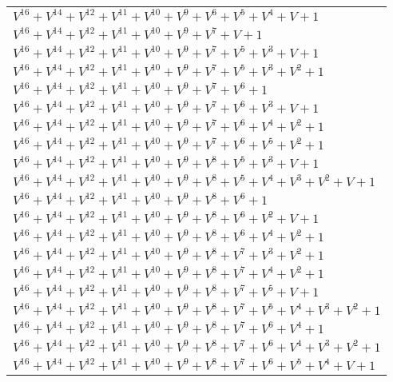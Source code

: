 \documentclass[12pt]{article}
\begin{document}
\begin{adjustwidth}{-4cm}{}
\begin{center}
\begin{longtable}{|l|}
$V^{16}  +V^{14}  +V^{12}  +V^{11}  +V^{10}  +V^{9}  +V^{6}  +V^{5}  +V^{4}  + V + 1$ \\
$V^{16}  +V^{14}  +V^{12}  +V^{11}  +V^{10}  +V^{9}  +V^{7}  + V + 1$ \\
$V^{16}  +V^{14}  +V^{12}  +V^{11}  +V^{10}  +V^{9}  +V^{7}  +V^{5}  +V^{3}  + V + 1$ \\
$V^{16}  +V^{14}  +V^{12}  +V^{11}  +V^{10}  +V^{9}  +V^{7}  +V^{5}  +V^{3}  +V^{2}  + 1$ \\
$V^{16}  +V^{14}  +V^{12}  +V^{11}  +V^{10}  +V^{9}  +V^{7}  +V^{6}  + 1$ \\
$V^{16}  +V^{14}  +V^{12}  +V^{11}  +V^{10}  +V^{9}  +V^{7}  +V^{6}  +V^{3}  + V + 1$ \\
$V^{16}  +V^{14}  +V^{12}  +V^{11}  +V^{10}  +V^{9}  +V^{7}  +V^{6}  +V^{4}  +V^{2}  + 1$ \\
$V^{16}  +V^{14}  +V^{12}  +V^{11}  +V^{10}  +V^{9}  +V^{7}  +V^{6}  +V^{5}  +V^{2}  + 1$ \\
$V^{16}  +V^{14}  +V^{12}  +V^{11}  +V^{10}  +V^{9}  +V^{8}  +V^{5}  +V^{3}  + V + 1$ \\
$V^{16}  +V^{14}  +V^{12}  +V^{11}  +V^{10}  +V^{9}  +V^{8}  +V^{5}  +V^{4}  +V^{3}  +V^{2}  + V + 1$ \\
$V^{16}  +V^{14}  +V^{12}  +V^{11}  +V^{10}  +V^{9}  +V^{8}  +V^{6}  + 1$ \\
$V^{16}  +V^{14}  +V^{12}  +V^{11}  +V^{10}  +V^{9}  +V^{8}  +V^{6}  +V^{2}  + V + 1$ \\
$V^{16}  +V^{14}  +V^{12}  +V^{11}  +V^{10}  +V^{9}  +V^{8}  +V^{6}  +V^{4}  +V^{2}  + 1$ \\
$V^{16}  +V^{14}  +V^{12}  +V^{11}  +V^{10}  +V^{9}  +V^{8}  +V^{7}  +V^{3}  +V^{2}  + 1$ \\
$V^{16}  +V^{14}  +V^{12}  +V^{11}  +V^{10}  +V^{9}  +V^{8}  +V^{7}  +V^{4}  +V^{2}  + 1$ \\
$V^{16}  +V^{14}  +V^{12}  +V^{11}  +V^{10}  +V^{9}  +V^{8}  +V^{7}  +V^{5}  + V + 1$ \\
$V^{16}  +V^{14}  +V^{12}  +V^{11}  +V^{10}  +V^{9}  +V^{8}  +V^{7}  +V^{5}  +V^{4}  +V^{3}  +V^{2}  + 1$ \\
$V^{16}  +V^{14}  +V^{12}  +V^{11}  +V^{10}  +V^{9}  +V^{8}  +V^{7}  +V^{6}  +V^{4}  + 1$ \\
$V^{16}  +V^{14}  +V^{12}  +V^{11}  +V^{10}  +V^{9}  +V^{8}  +V^{7}  +V^{6}  +V^{4}  +V^{3}  +V^{2}  + 1$ \\
$V^{16}  +V^{14}  +V^{12}  +V^{11}  +V^{10}  +V^{9}  +V^{8}  +V^{7}  +V^{6}  +V^{5}  +V^{4}  + V + 1$ \\

\end{longtable}
\end{center}
\end{adjustwidth}
\end{document}
